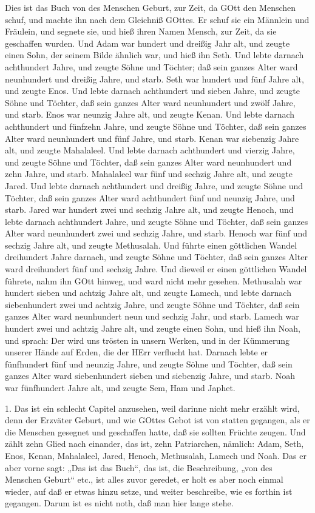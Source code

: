 Dies ist das Buch von des Menschen Geburt, zur Zeit, da GOtt den Menschen schuf, und machte ihn nach dem Gleichniß GOttes. Er schuf sie ein Männlein und Fräulein, und segnete sie, und hieß ihren Namen Mensch, zur Zeit, da sie geschaffen wurden. Und Adam war hundert und dreißig Jahr alt, und zeugte einen Sohn, der seinem Bilde ähnlich war, und hieß ihn Seth. Und lebte darnach achthundert Jahre, und zeugte Söhne und Töchter; daß sein ganzes Alter ward neunhundert und dreißig Jahre, und starb. Seth war hundert und fünf Jahre alt, und zeugte Enos. Und lebte darnach achthundert und sieben Jahre, und zeugte Söhne und Töchter, daß sein ganzes Alter ward neunhundert und zwölf Jahre, und starb. Enos war neunzig Jahre alt, und zeugte Kenan. Und lebte darnach achthundert und fünfzehn Jahre, und zeugte Söhne und Töchter, daß sein ganzes Alter ward neunhundert und fünf Jahre, und starb. Kenan war siebenzig Jahre alt, und zeugte Mahalaleel. Und lebte darnach achthundert und vierzig Jahre, und zeugte Söhne und Töchter, daß sein ganzes Alter ward neunhundert und zehn Jahre, und starb. Mahalaleel war fünf und sechzig Jahre alt, und zeugte Jared. Und lebte darnach achthundert und dreißig Jahre, und zeugte Söhne und Töchter, daß sein ganzes Alter ward achthundert fünf und neunzig Jahre, und starb. Jared war hundert zwei und sechzig Jahre alt, und zeugte Henoch, und lebte darnach achthundert Jahre, und zeugte Söhne und Töchter, daß sein ganzes Alter ward neunhundert zwei und sechzig Jahre, und starb. Henoch war fünf und sechzig Jahre alt, und zeugte Methusalah. Und führte einen göttlichen Wandel dreihundert Jahre darnach, und zeugte Söhne und Töchter, daß sein ganzes Alter ward dreihundert fünf und sechzig Jahre. Und dieweil er einen göttlichen Wandel führete, nahm ihn GOtt hinweg, und ward nicht mehr gesehen. Methusalah war hundert sieben und achtzig Jahre alt, und zeugte Lamech, und lebte darnach siebenhundert zwei und achtzig Jahre, und zeugte Söhne und Töchter, daß sein ganzes Alter ward neunhundert neun und sechzig Jahr, und starb. Lamech war hundert zwei und achtzig Jahre alt, und zeugte einen Sohn, und hieß ihn Noah, und sprach: Der wird uns trösten in unsern Werken, und in der Kümmerung unserer Hände auf Erden, die der HErr verflucht hat. Darnach lebte er fünfhundert fünf und neunzig Jahre, und zeugte Söhne und Töchter, daß sein ganzes Alter ward siebenhundert sieben und siebenzig Jahre, und starb. Noah war fünfhundert Jahre alt, und zeugte Sem, Ham und Japhet.

1. Das ist ein schlecht Capitel anzusehen, weil darinne nicht mehr erzählt wird, denn der Erzväter Geburt, und wie GOttes Gebot ist von statten gegangen, als er die Menschen gesegnet und geschaffen hatte, daß sie sollten Früchte zeugen. Und zählt zehn Glied nach einander, das ist, zehn Patriarchen, nämlich: Adam, Seth, Enos, Kenan, Mahalaleel, Jared, Henoch, Methusalah, Lamech und Noah. Das er aber vorne sagt: „Das ist das Buch“, das ist, die Beschreibung, „von des Menschen Geburt“ etc., ist alles zuvor geredet, er holt es aber noch einmal wieder, auf daß er etwas hinzu setze, und weiter beschreibe, wie es forthin ist gegangen. Darum ist es nicht noth, daß man hier lange stehe.

